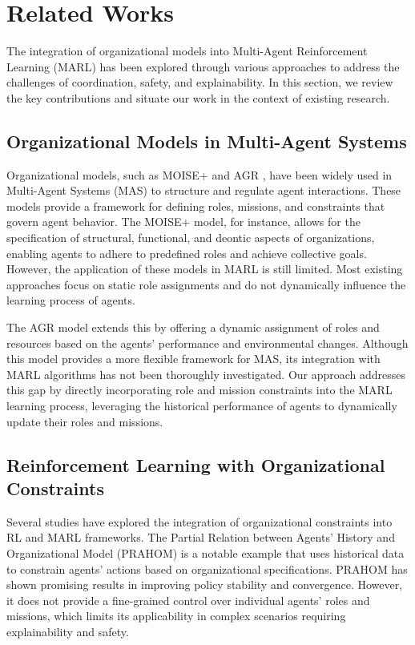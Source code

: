 \documentclass[sigconf,anonymous]{aamas}
\begin{document}
\section{Related Works}
\label{sec:related_works}

The integration of organizational models into Multi-Agent Reinforcement Learning (MARL) has been explored through various approaches to address the challenges of coordination, safety, and explainability. In this section, we review the key contributions and situate our work in the context of existing research.

\subsection{Organizational Models in Multi-Agent Systems}
Organizational models, such as MOISE+ \cite{moise_reference} and AGR \cite{agr_reference}, have been widely used in Multi-Agent Systems (MAS) to structure and regulate agent interactions. These models provide a framework for defining roles, missions, and constraints that govern agent behavior. The MOISE+ model, for instance, allows for the specification of structural, functional, and deontic aspects of organizations, enabling agents to adhere to predefined roles and achieve collective goals. However, the application of these models in MARL is still limited. Most existing approaches focus on static role assignments and do not dynamically influence the learning process of agents.

The AGR model \cite{agr_reference} extends this by offering a dynamic assignment of roles and resources based on the agents' performance and environmental changes. Although this model provides a more flexible framework for MAS, its integration with MARL algorithms has not been thoroughly investigated. Our approach addresses this gap by directly incorporating role and mission constraints into the MARL learning process, leveraging the historical performance of agents to dynamically update their roles and missions.

\subsection{Reinforcement Learning with Organizational Constraints}
Several studies have explored the integration of organizational constraints into RL and MARL frameworks. The Partial Relation between Agents' History and Organizational Model (PRAHOM) \cite{prahom_reference} is a notable example that uses historical data to constrain agents' actions based on organizational specifications. PRAHOM has shown promising results in improving policy stability and convergence. However, it does not provide a fine-grained control over individual agents' roles and missions, which limits its applicability in complex scenarios requiring explainability and safety.
\end{document}
